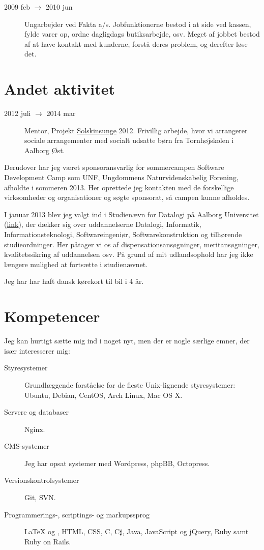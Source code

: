 \documentclass[margin,line,a4paper]{resume}
\begin{document}
\begin{resume}
\begin{description}
  \item[2009 feb $\rightarrow$ 2010 jun] Ungarbejder ved Fakta
    a/s. Jobfunktionerne bestod i at side ved kassen, fylde varer op,
    ordne dagligdags butiksarbejde, osv. Meget af jobbet bestod af at have
    kontakt med kunderne, forstå deres problem, og derefter løse det.
\end{description}

\section{\mysidestyle Andet aktivitet}\vspace{1mm}
\begin{description}
  \item[2012 juli $\rightarrow$ 2014 mar] Mentor, Projekt
    \href{http://www.urk.dk/solskinsunge/}{Solskinsunge} 2012. Frivillig
    arbejde, hvor vi arrangerer sociale arrangementer med socialt udsatte
    børn fra Tornhøjskolen i Aalborg Øst.
\end{description}
Derudover har jeg været sponsoransvarlig for sommercampen Software
Development Camp som UNF, Ungdommens Naturvidenskabelig Forening,
afholdte i sommeren 2013. Her oprettede jeg kontakten med de
forskellige virksomheder og organisationer og søgte sponsorat, så campen
kunne afholdes.

I januar 2013 blev jeg valgt ind i Studienævn
for Datalogi på Aalborg Universitet
(\href{http://www.sict.aau.dk/studienaevn-for-datalogi/}{link}),
der dækker sig over uddannelserne Datalogi, Informatik,
Informationsteknologi, Softwareingeniør, Softwarekonstruktion
og tilhørende studieordninger. Her påtager vi os af
dispensationsansøgninger, meritansøgninger, kvalitetssikring af
uddannelsen osv. På grund af mit udlandsophold har jeg ikke længere
mulighed at fortsætte i studienævnet.

Jeg har har haft dansk kørekort til bil i 4 år.

\section{\mysidestyle Kompetencer} \vspace{1mm}
Jeg kan hurtigt sætte mig ind i noget nyt, men der er nogle særlige
emner, der især interesserer mig:
\vspace{0.5cm}
\begin{description}
  \item[Styresystemer] Grundlæggende forståelse for de fleste
    Unix-lignende styresystemer: Ubuntu, Debian, CentOS, Arch Linux, Mac OS
    X.
  \item[Servere og databaser] Nginx. 
  \item[CMS-systemer] Jeg har opsat systemer med Wordpress, phpBB,
    Octopress.
  \item[Versionskontrolsystemer] Git, SVN.
  \item[Programmerings-, scriptings- og markupssprog] \LaTeX{} og
  \XeTeX{}, HTML, CSS, C, C$\sharp$, Java, JavaScript og jQuery, Ruby samt Ruby
  on Rails.
\end{description}


\end{resume}
\end{document}
